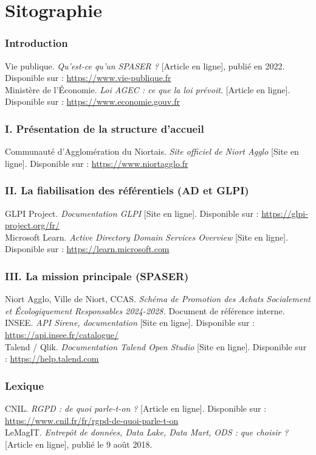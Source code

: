 \documentclass[11pt,a4paper]{article}
\begin{document}
\section*{Sitographie}

\subsubsection*{Introduction}
Vie publique. \emph{Qu'est-ce qu'un SPASER ?} [Article en ligne], publié en 2022. Disponible sur : \url{https://www.vie-publique.fr}\\[3pt]
Ministère de l'Économie. \emph{Loi AGEC : ce que la loi prévoit.} [Article en ligne]. Disponible sur : \url{https://www.economie.gouv.fr}

\subsubsection*{I. Présentation de la structure d'accueil}
Communauté d'Agglomération du Niortais. \emph{Site officiel de Niort Agglo} [Site en ligne]. Disponible sur : \url{https://www.niortagglo.fr}

\subsubsection*{II. La fiabilisation des référentiels (AD et GLPI)}
GLPI Project. \emph{Documentation GLPI} [Site en ligne]. Disponible sur : \url{https://glpi-project.org/fr/}\\[3pt]
Microsoft Learn. \emph{Active Directory Domain Services Overview} [Site en ligne]. Disponible sur : \url{https://learn.microsoft.com}

\subsubsection*{III. La mission principale (SPASER)}
Niort Agglo, Ville de Niort, CCAS. \emph{Schéma de Promotion des Achats Socialement et Écologiquement Responsables 2024-2028.} Document de référence interne.\\[3pt]
INSEE. \emph{API Sirene, documentation} [Site en ligne]. Disponible sur : \url{https://api.insee.fr/catalogue/}\\[3pt]
Talend / Qlik. \emph{Documentation Talend Open Studio} [Site en ligne]. Disponible sur : \url{https://help.talend.com}

\subsubsection*{Lexique}
CNIL. \emph{RGPD : de quoi parle-t-on ?} [Article en ligne]. Disponible sur : \url{https://www.cnil.fr/fr/rgpd-de-quoi-parle-t-on}\\[3pt]
LeMagIT. \emph{Entrepôt de données, Data Lake, Data Mart, ODS : que choisir ?} [Article en ligne], publié le 9 août 2018.
\end{document}
